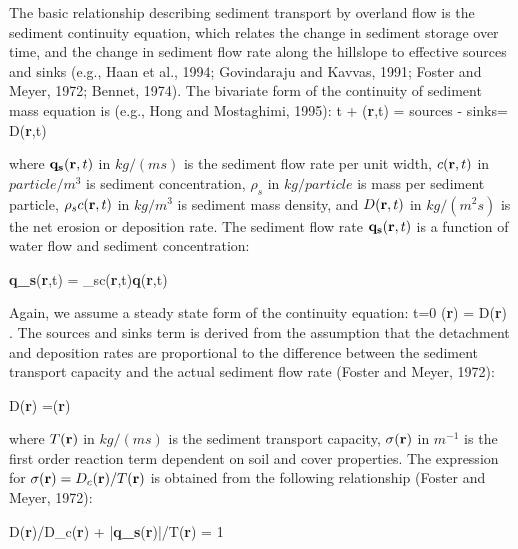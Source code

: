 \documentclass{kapedbk} %
\begin{document}
\medskip
The basic relationship describing sediment transport by overland flow
is the sediment continuity equation,
which relates the change in sediment storage over time, and the change
in sediment flow rate along the hillslope to effective sources and sinks
(e.g., Haan et al., 1994; Govindaraju and Kavvas, 1991;
Foster and Meyer, 1972; Bennet, 1974).
The bivariate form of the continuity of sediment mass equation is
(e.g., Hong and Mostaghimi, 1995):
\leftequation
{\partial [\rho_sc({\bf r},t)h({\bf r},t)] \over \partial t} +
\nabla{}({\bf r},t) = {\rm sources - sinks}=
D({\bf r},t)
\endleftequation

\noindent
where
${\bf q_s}({\bf r},t)$ in $kg/(ms)$ is the sediment flow rate per unit width,
$c({\bf r},t)$  in $ particle/m^3$ is sediment concentration,
$\rho_s$ in $kg/particle$ is mass per sediment particle,
$\rho_s c({\bf r},t)$ in $kg/m^3$ is sediment mass density,
and $D({\bf r},t)$ in $kg/(m^2s)$ is the net erosion or deposition rate.
The sediment flow rate ${\bf q_s}({\bf r},t) $ is a function of
water flow and sediment concentration:

\leftequation
  {\bf q_s}({\bf r},t) = \rho_sc({\bf r},t){\bf q}({\bf r},t)
\endleftequation

\noindent
Again, we assume a steady state form of
the continuity equation:
\leftequation
{\partial [\rho_sc({\bf r},t)h({\bf r},t)] \over \partial t}=0
\quad
\longrightarrow \quad
\nabla{}({\bf r}) = D({\bf r}) .
\endleftequation
\noindent
The sources and sinks term is derived from the assumption that
the detachment and deposition rates are proportional to the difference between
the sediment transport capacity and the actual
sediment flow rate (Foster and Meyer, 1972):

\leftequation
D({\bf r})
=\sigma({\bf r}) \bigl[ T({\bf r})- |{\bf q_s}({\bf r})|\bigr]
\endleftequation

\noindent
where $T({\bf r})$ in $kg/(ms)$ is the sediment transport capacity,
$\sigma({\bf r})$ in $m^{-1}$ is the first order reaction term
 dependent on soil and cover properties.
 The expression for $\sigma({\bf r})=D_c({\bf r})/T({\bf r})$
is obtained from the following relationship (Foster and Meyer, 1972):

\leftequation
D({\bf r})/D_c({\bf r}) + |{\bf q_s}({\bf r})|/T({\bf r}) = 1
\endleftequation
\end{document}
